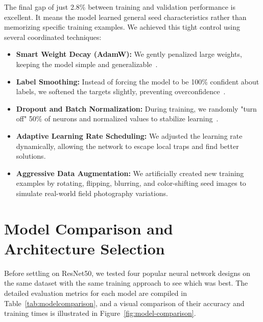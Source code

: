 The final gap of just 2.8\% between training and validation performance is excellent. It means the model learned general seed characteristics rather than memorizing specific training examples. We achieved this tight control using several coordinated techniques:

\begin{itemize}
    \item \textbf{Smart Weight Decay (AdamW):} We gently penalized large weights, keeping the model simple and generalizable~\cite{loshchilov2019adamw}.
    
    \item \textbf{Label Smoothing:} Instead of forcing the model to be 100\% confident about labels, we softened the targets slightly, preventing overconfidence~\cite{muller2019label}.
    
    \item \textbf{Dropout and Batch Normalization:} During training, we randomly "turn off" 50\% of neurons and normalized values to stabilize learning~\cite{he2016deep}.
    
    \item \textbf{Adaptive Learning Rate Scheduling:} We adjusted the learning rate dynamically, allowing the network to escape local traps and find better solutions.
    
    \item \textbf{Aggressive Data Augmentation:} We artificially created new training examples by rotating, flipping, blurring, and color-shifting seed images to simulate real-world field photography variations.
\end{itemize}

\section{Model Comparison and Architecture Selection}

Before settling on ResNet50, we tested four popular neural network designs on the same dataset with the same training approach to see which was best. The detailed evaluation metrics for each model are compiled in Table~\ref{tab:modelcomparison}, and a visual comparison of their accuracy and training times is illustrated in Figure~\ref{fig:model-comparison}.

